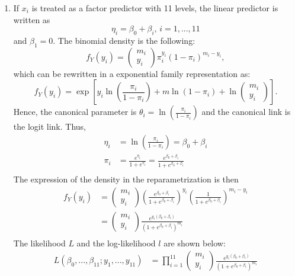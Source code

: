 \begin{solution}{2.9}
\begin{enumerate}
\item If $x_{i}$ is treated as a factor predictor with 11 levels, the linear predictor is written as $$\eta_{i}=\beta_{0}+\beta_{i} \mbox{,  } i=1,...,11$$ and $\beta_{1}=0$. The binomial density is the following: $$f_{Y}(y_{i})=\begin{pmatrix} m_{i} \\ y_{i} \end{pmatrix}\pi_{i}^{y_{i}}(1-\pi_{i})^{m_{i}-y_{i}},$$ which can be rewritten in a exponential family representation as: $$f_{Y}(y_{i})=\exp\left[y_{i}\ln\left(\frac{\pi_{i}}{1-\pi_{i}}\right)+m\ln(1-\pi_{i})+\ln\begin{pmatrix} m_{i} \\ y_{i} \end{pmatrix}\right].$$ Hence, the canonical parameter is $\theta_{i}=\ln\left(\frac{\pi_{i}}{1-\pi_{i}}\right)$ and the canonical link is the logit link. Thus,
\begin{align*}
\eta_{i}&=\ln\left(\frac{\pi_{i}}{1-\pi_{i}}\right)=\beta_{0}+\beta_{i} \\
\pi_{i}&=\frac{e^{\eta_{i}}}{1+e^{\eta_{i}}}= \frac{e^{\beta_{0}+\beta_{i}}}{1+e^{\beta_{0}+\beta_{i}}}\\
\end{align*}
The expression of the density in the reparametrization is then
\begin{align*}
f_{Y}(y_{i})&=\begin{pmatrix} m_{i} \\ y_{i} \end{pmatrix}\left(\frac{e^{\beta_{0}+\beta_{i}}}{1+e^{\beta_{0}+\beta_{i}}}\right)^{y_{i}}\left(\frac{1}{1+e^{\beta_{0}+\beta_{i}}}\right)^{m_{i}-y_{i}}\\
&=\begin{pmatrix} m_{i} \\ y_{i} \end{pmatrix}\frac{e^{y_{i}(\beta_{0}+\beta_{i})}}{(1+e^{\beta_{0}+\beta_{i}})^{m_{i}}}\\
\end{align*} The likelihood $L$ and the log-likelihood $l$ are shown below:
\begin{align*}
L(\beta_{0},...,\beta_{11};y_{1},...,y_{11})&=\prod_{i=1}^{11} \begin{pmatrix} m_{i} \\ y_{i} \end{pmatrix}\frac{e^{y_{i}(\beta_{0}+\beta_{i})}}{(1+e^{\beta_{0}+\beta_{i}})^{m_{i}}}\\

\end{align*}
\end{enumerate}
\end{solution}
